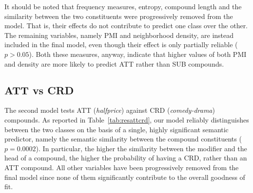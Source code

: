 \documentclass[output=paper]{langsci/langscibook}
\begin{document}
It should be noted that frequency measures, entropy, compound length and the similarity between the two constituents were progressively removed from the model. That is, their effects do not contribute to predict one class over the other. The remaining variables, namely PMI and neighborhood density, are instead included in the final model, even though their effect is only partially reliable ($p>0.05$). Both these measures, anyway, indicate that higher values of both PMI and density are more likely to predict ATT rather than SUB compounds.



\subsection{ATT vs CRD}

The second model tests ATT (\emph{halfprice}) against CRD (\emph{comedy-drama}) compounds. As reported in Table~\ref{tab:resattcrd}, our model reliably distinguishes between the two classes on the basis of a single, highly significant semantic predictor, namely the semantic similarity between the compound constituents ($p=0.0002$). In particular, the higher the similarity between the modifier and the head of a compound, the higher the probability of having a CRD, rather than an ATT compound. All other variables have been progressively removed from the final model since none of them significantly contribute to the overall goodness of fit.
\end{document}
